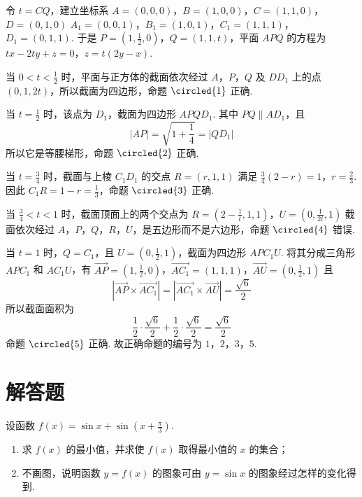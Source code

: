 \begin{solution}
令 \(t=CQ\)，建立坐标系
\(A=(0,0,0)\)，\(B=(1,0,0)\)，\(C=(1,1,0)\)，\(D=(0,1,0)\)
\(A_1=(0,0,1)\)，\(B_1=(1,0,1)\)，\(C_1=(1,1,1)\)，\(D_1=(0,1,1)\).
于是 \(P=(1,\frac12,0)\)，\(Q=(1,1,t)\)，平面 \(APQ\) 的方程为
\(tx-2ty+z=0\)，\(z=t(2y-x)\).

当 \(0<t<\frac12\) 时，平面与正方体的截面依次经过 \(A\)，\(P\)，\(Q\) 及 \(DD_1\) 上的点 \((0,1,2t)\)，所以截面为四边形，命题 \(\circled{1}\) 正确.

当 \(t=\frac12\) 时，该点为 \(D_1\)，截面为四边形 \(APQD_1\). 其中 \(PQ\parallel AD_1\)，且
\[
|AP|=\sqrt{1+\frac14}=|QD_1|
\]
所以它是等腰梯形，命题 \(\circled{2}\) 正确.

当 \(t=\frac34\) 时，截面与上棱 \(C_1D_1\) 的交点 \(R=(r,1,1)\) 满足
\(\frac34(2-r)=1\)，\(r=\frac23\).
因此 \(C_1R=1-r=\frac13\)，命题 \(\circled{3}\) 正确.

当 \(\frac34<t<1\) 时，截面顶面上的两个交点为
\(R=\left(2-\frac1t,1,1\right)\)，\(U=\left(0,\frac1{2t},1\right)\)
截面依次经过 \(A\)，\(P\)，\(Q\)，\(R\)，\(U\)，是五边形而不是六边形，命题 \(\circled{4}\) 错误.

当 \(t=1\) 时，\(Q=C_1\)，且 \(U=(0,\frac12,1)\)，截面为四边形 \(APC_1U\). 将其分成三角形 \(APC_1\) 和 \(AC_1U\)，有
\(\overrightarrow{AP}=\left(1,\frac12,0\right)\)，\(\overrightarrow{AC_1}=(1,1,1)\)，\(\overrightarrow{AU}=\left(0,\frac12,1\right)\)
且
\[
\left|\overrightarrow{AP}\times\overrightarrow{AC_1}\right|
=\left|\overrightarrow{AC_1}\times\overrightarrow{AU}\right|=\frac{\sqrt6}{2}
\]
所以截面面积为
\[
\frac12\cdot\frac{\sqrt6}{2}+\frac12\cdot\frac{\sqrt6}{2}=\frac{\sqrt6}{2}
\]
命题 \(\circled{5}\) 正确. 故正确命题的编号为 \(1\)，\(2\)，\(3\)，\(5\).
\end{solution}

\section{解答题}

\begin{problem}
设函数 \( f(x) = \sin x + \sin \left(x + \frac{\pi}{3}\right) \).
\begin{enumerate}
\item 求 \( f(x) \) 的最小值，并求使 \( f(x) \) 取得最小值的 \(x\) 的集合；
\item 不画图，说明函数 \( y = f(x) \) 的图象可由 \( y = \sin x \) 的图象经过怎样的变化得到.
\end{enumerate}
\end{problem}

